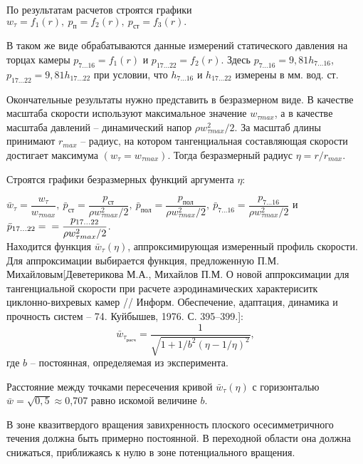 \documentclass[12pt,a4paper]{article}
\begin{document}
По результатам расчетов строятся графики $w_{\tau}=f_1(r),\ p_{\text{п}}=f_2(r),\ p_{\text{ст}}=f_3(r).$

В таком же виде обрабатываются данные измерений статического
давления на торцах камеры $p_{7\dots 16} = f_1(r)$ и $p_{17\dots 22} = f_2(r)$.
Здесь $p_{7\dots 16} =9,81h_{7\dots 16}$, $p_{17\dots 22} =9,81h_{17\dots 22}$
при условии, что $h_{7\dots 16}$ и $h_{17\dots 22}$
измерены в мм. вод. ст.

Окончательные результаты нужно представить в безразмерном виде. В качестве масштаба скорости используют максимальное значение $w_{\tau max}$, а в качестве масштаба давлений – динамический напор $\rho w_{\tau max}^2/2$. 
За масштаб длины принимают $r_{max}$ – радиус, на котором
тангенциальная составляющая скорости достигает максимума
$(w_{\tau}=w_{\tau max})$.
Тогда безразмерный радиус $\eta=r/r_{max}$.


Строятся графики безразмерных функций аргумента $\eta$:

$\bar w_{\tau} = \dfrac{w_{\tau}}{w_{\tau max}},\ \bar p_{\text{ст}} = \dfrac{p_{\text{ст}}}{\rho w_{\tau max}^2/2},\ \bar p_{\text{пол}}=\dfrac{p_{\text{пол}}}{\rho w_{\tau max}^2/2},\ \bar p_{7\dots 16} = \dfrac{p_{7\dots 16}}{\rho w_{\tau max}^2/2} $ и $\bar p_{17\dots 22} =\\= \dfrac{p_{17\dots 22}}{\rho w_{\tau max}^2/2}$.
\\

Находится функция $\bar w_{\tau} (\eta)$, аппроксимирующая измеренный профиль скорости. Для аппроксимации выбирается функция, предложенную П.М. Михайловым[Деветерикова М.А., Михайлов П.М. О новой аппроксимации для тангенциальной скорости при расчете аэродинамических характериситк циклонно-вихревых камер // Информ. Обеспечение, адаптация, динамика и прочность систем – 74.
Куйбышев, 1976. С. 395–399.]:
\begin{equation}
\bar w_{\tau_\text{расч}} = \dfrac{1}{\sqrt{1+1/b^2\left(\eta - 1/\eta \right)^2}},
\end{equation}
где $b$ – постоянная, определяемая из эксперимента.

 Расстояние между точками пересечения кривой $\bar w_{\tau}(\eta)$ с горизонталью $\bar w = \sqrt{0,5} \approx $0,707
равно искомой величине $b$. 

В зоне квазитвердого вращения завихренность плоского осесимметричного течения
должна быть примерно постоянной. В переходной области она должна снижаться, приближаясь к нулю в зоне потенциального вращения. 
\end{document}

